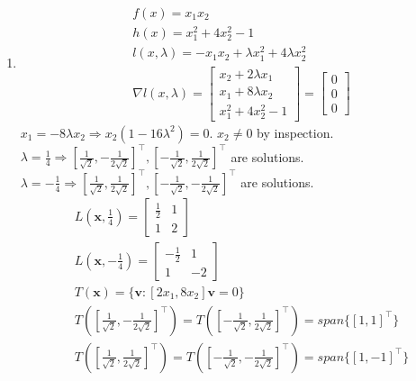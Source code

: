 \documentclass[10pt]{article}
\begin{document}
\begin{enumerate}
\begin{enumerate}
        \item \begin{align*}
            &f(x)=x_1x_2\\
            &h(x)=x_1^2+4x_2^2-1\\
            &l(x,\lambda)=-x_1x_2+\lambda x_1^2+4\lambda x_2^2\\
            &\nabla l(x,\lambda)=\begin{bmatrix}
                x_2+2\lambda x_1\\
                x_1+8\lambda x_2\\
                x_1^2+4x_2^2-1
            \end{bmatrix}=\begin{bmatrix}
                0\\
                0\\
                0
            \end{bmatrix}
        \end{align*}
        $x_1=-8\lambda x_2\Rightarrow x_2(1-16\lambda^2)=0$. $x_2\neq 0$ by inspection.\\
        $\lambda=\frac{1}{4}\Rightarrow {[\frac{1}{\sqrt{2}},-\frac{1}{2\sqrt{2}}]}^\top,{[-\frac{1}{\sqrt{2}},\frac{1}{2\sqrt{2}}]}^\top$ are solutions.\\
        $\lambda=-\frac{1}{4}\Rightarrow {[\frac{1}{\sqrt{2}},\frac{1}{2\sqrt{2}}]}^\top,{[-\frac{1}{\sqrt{2}},-\frac{1}{2\sqrt{2}}]}^\top$ are solutions.
        \begin{align*}
            &L(\mathbf{x},\frac{1}{4})=\begin{bmatrix}
                \frac{1}{2} & 1\\
                1 & 2
            \end{bmatrix}\\
            &L(\mathbf{x},-\frac{1}{4})=\begin{bmatrix}
                -\frac{1}{2} & 1\\
                1 & -2
            \end{bmatrix}\\
            &T(\mathbf{x})=\{\mathbf{v}:[2x_1,8x_2]\mathbf{v}=0\}\\
            &T({[\frac{1}{\sqrt{2}},-\frac{1}{2\sqrt{2}}]}^\top)=T({[-\frac{1}{\sqrt{2}},\frac{1}{2\sqrt{2}}]}^\top)=span\{{[1,1]}^\top\}\\
            &T({[\frac{1}{\sqrt{2}},\frac{1}{2\sqrt{2}}]}^\top)=T({[-\frac{1}{\sqrt{2}},-\frac{1}{2\sqrt{2}}]}^\top)=span\{{[1,-1]}^\top\}
        \end{align*}

\end{enumerate}
\end{enumerate}
\end{document}
